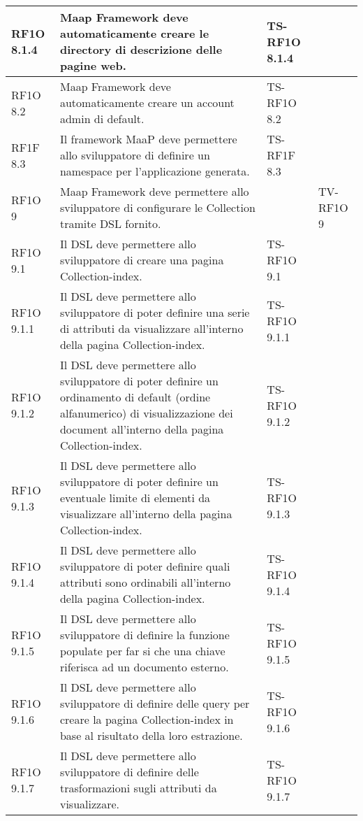 \begin{center}
\begin{longtable}{| p{2cm} | p{6cm} | p{2.5cm} | p{2.5cm} | }
        RF1O 8.1.4 & 
        Maap Framework deve automaticamente creare le directory di descrizione delle pagine web. & TS-RF1O 8.1.4 & \\ \hline 
        RF1O 8.2 & 
        Maap Framework deve automaticamente creare un account admin di default. & TS-RF1O 8.2 & \\ \hline 
        RF1F 8.3 & 
        Il framework MaaP deve permettere allo sviluppatore di definire un namespace per l’applicazione generata. & TS-RF1F 8.3 & \\ \hline 
        RF1O 9 & 
        Maap Framework deve permettere allo sviluppatore di configurare le Collection tramite DSL fornito. &  & TV-RF1O 9 \\ \hline 
        RF1O 9.1 & 
        Il DSL deve permettere allo sviluppatore di creare una pagina Collection-index. & TS-RF1O 9.1 & \\ \hline 
        RF1O 9.1.1 & 
        Il DSL deve permettere allo sviluppatore di poter definire una serie di attributi da visualizzare all’interno della pagina Collection-index. & TS-RF1O 9.1.1 & \\ \hline 
        RF1O 9.1.2 & 
        Il DSL deve permettere allo sviluppatore di poter definire un ordinamento di default (ordine alfanumerico) di visualizzazione dei document all'interno della pagina Collection-index. & TS-RF1O 9.1.2 & \\ \hline 
        RF1O 9.1.3 & 
        Il DSL deve permettere allo sviluppatore di poter definire un eventuale limite di elementi da visualizzare all’interno della pagina Collection-index. & TS-RF1O 9.1.3 & \\ \hline 
        RF1O 9.1.4 & 
        Il DSL deve permettere allo sviluppatore di poter definire quali attributi sono ordinabili all’interno della pagina Collection-index. & TS-RF1O 9.1.4 & \\ \hline 
        RF1O 9.1.5 & 
        Il DSL deve permettere allo sviluppatore di definire la funzione populate per far si che una chiave riferisca ad un documento esterno. & TS-RF1O 9.1.5 & \\ \hline 
        RF1O 9.1.6 & 
        Il DSL deve permettere allo sviluppatore di definire delle query per creare la pagina Collection-index in base al risultato della loro estrazione. & TS-RF1O 9.1.6 & \\ \hline 
        RF1O 9.1.7 & 
        Il DSL deve permettere allo sviluppatore di definire delle trasformazioni sugli attributi da visualizzare. & TS-RF1O 9.1.7 & \\ \hline 

\end{longtable}
\end{center}
